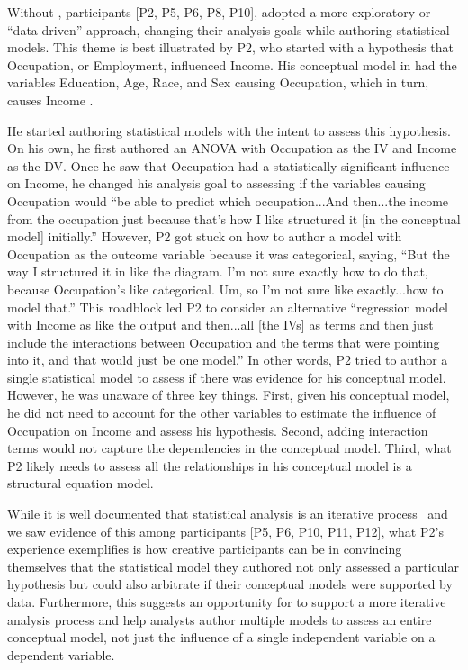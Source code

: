 Without \rTisane, participants [P2, P5, P6, P8, P10], adopted a more exploratory
or ``data-driven'' approach, changing their analysis goals while authoring
statistical models. This theme is best illustrated by P2, who started with a
hypothesis that Occupation, or Employment, influenced Income. His conceptual
model in \rTisane had the variables Education, Age, Race, and Sex causing
Occupation, which in turn, causes Income . 

He started authoring statistical models with the intent to assess this
hypothesis. On his own, he first authored an ANOVA with Occupation as the IV and
Income as the DV. Once he saw that Occupation had a statistically significant
influence on Income, he changed his analysis goal to assessing if the variables
causing Occupation would ``be able to predict which occupation...And then...the
income from the occupation just because that’s how I like structured it [in the
conceptual model] initially.'' However, P2 got stuck on how to author a model
with Occupation as the outcome variable because it was categorical, saying,
``But the way I structured it in like the diagram. I'm not sure exactly how to
do that, because Occupation's like categorical. Um, so I'm not sure like
exactly...how to model that.'' This roadblock led P2 to consider an alternative
``regression model with Income as like the output and then...all [the IVs] as
terms and then just include the interactions between Occupation and the terms
that were pointing into it, and that would just be one model.'' In other words,
P2 tried to author a single statistical model to assess if there was evidence
for his conceptual model. However, he was unaware of three key things. First,
given his conceptual model, he did not need to account for the other variables
to estimate the influence of Occupation on Income and assess his hypothesis.
Second, adding interaction terms would not capture the dependencies in the
conceptual model. Third, what P2 likely needs to assess all the relationships in
his conceptual model is a structural equation model.

While it is well documented that statistical analysis is an iterative
process~\cite{grolemund2014cognitive, jun2022hypoForm} and we saw evidence of
this among participants [P5, P6, P10, P11, P12], what P2's experience
exemplifies is how creative participants can be in convincing themselves that the
statistical model they authored not only assessed a particular hypothesis but
could also arbitrate if their conceptual models were supported by data.
Furthermore, this suggests an opportunity for \rTisane to support a more
iterative analysis process and help analysts author multiple models to assess an
entire conceptual model, not just the influence of a single independent variable
on a dependent variable. 

